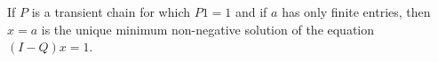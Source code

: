 If $P$ is a transient chain for which $P1 = 1$ and if $a$ has only finite entries, then $x = a$ is the unique minimum non-negative solution of the equation $(I - Q)x = 1$.
